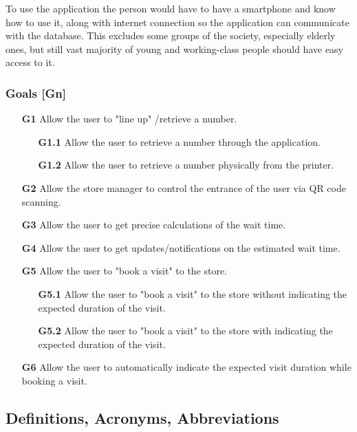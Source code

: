 To use the application the person would have to have a smartphone and know how to use it, along with internet connection so the application can communicate with the database. This excludes some groups of the society, especially elderly ones, but still vast majority of young and working-class people should have easy access to it.
\newpage
\subsubsection{Goals [Gn]}
\hspace{\parindent}\begin{itemize}
	\item[\textbf{G1}]Allow the user to "line up" /retrieve a number.
	\begin{itemize}
		\item[\textbf{G1.1}]Allow the user to retrieve a number through the application.
		\item[\textbf{G1.2}]Allow the user to retrieve a number physically from the printer. 
	\end{itemize}
	\item[\textbf{G2}]Allow the store manager to control the entrance of the user via QR code scanning. 
	\item[\textbf{G3}]Allow the user to get precise calculations of the wait time. 
	\item[\textbf{G4}]Allow the user to get updates/notifications on the estimated wait time.
	\item[\textbf{G5}]Allow the user to "book a visit" to the store.
	\begin{itemize}
		\item[\textbf{G5.1}]Allow the user to "book a visit" to the store without indicating the expected duration of the visit.
		\item[\textbf{G5.2}]Allow the user to "book a visit" to the store with indicating the expected duration of the visit. 
	\end{itemize}
	\item[\textbf{G6}]Allow the user to automatically indicate the expected visit duration while booking a visit. 
\end{itemize}

\newpage
\subsection{Definitions, Acronyms, Abbreviations}
